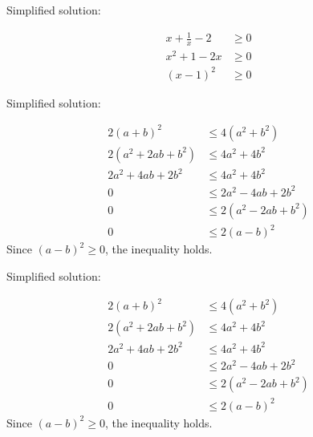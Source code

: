 \documentclass{article}
\begin{document}
Simplified solution:
\begin{tcolorbox}[colback=blue!10, width=\linewidth]
\begin{align*} x + \frac{1}{x} - 2 &\geq 0 \\ x^2 + 1 - 2x &\geq 0 \\ (x-1)^2 &\geq 0\end{align*} 

\end{tcolorbox}



Simplified solution:
\begin{tcolorbox}[colback=blue!10, width=\linewidth]
\begin{align*} 2(a+b)^2 &\leq 4(a^2+b^2) \\ 2(a^2+2ab+b^2) &\leq 4a^2+4b^2 \\ 2a^2+4ab+2b^2 &\leq 4a^2+4b^2 \\ 0 &\leq 2a^2-4ab+2b^2 \\ 0 &\leq 2(a^2-2ab+b^2) \\ 0 &\leq 2(a-b)^2\end{align*} 
Since $(a-b)^2 \ge 0$, the inequality holds.

\end{tcolorbox}



Simplified solution:
\begin{tcolorbox}[colback=blue!10, width=\linewidth]
\begin{align*} 2(a+b)^2 &\leq 4(a^2+b^2) \\ 2(a^2+2ab+b^2) &\leq 4a^2+4b^2 \\ 2a^2+4ab+2b^2 &\leq 4a^2+4b^2 \\ 0 &\leq 2a^2-4ab+2b^2 \\ 0 &\leq 2(a^2-2ab+b^2) \\ 0 &\leq 2(a-b)^2\end{align*} 
Since $(a-b)^2 \ge 0$, the inequality holds.

\end{tcolorbox}
\end{document}
